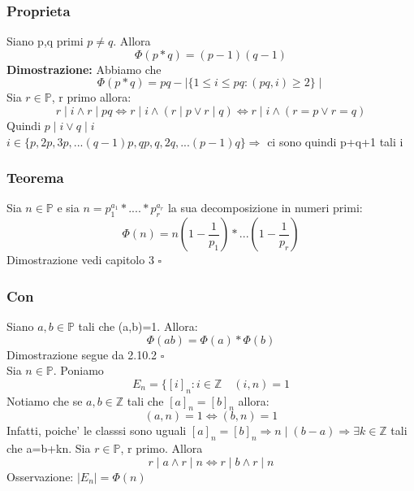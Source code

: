 \documentclass{article}
\begin{document}
     \subsubsection{Proprieta}
     \begin{flushleft}
      Siano p,q primi $p \neq q$. Allora 
       \begin{equation}
         \Phi (p*q)=(p-1)(q-1)
       \end{equation}
       \textbf{Dimostrazione:} Abbiamo che 
       \begin{equation}
         \Phi (p*q)=pq-\mid \{1 \leq i \leq pq : (pq,i) \geq 2\} \mid 
       \end{equation}
       Sia $r\in \mathbb{P}$, r primo allora:
       \begin{equation}
         r \mid i \land r \mid pq \iff r \mid i \land (r\mid p \lor r\mid q) \iff r\mid i \land (r=p \lor r=q)
       \end{equation}
       Quindi $p \mid i \lor q \mid i$ \\ 
       $i \in \{ p, 2p,3p,...(q-1)p,qp,q,2q,...(p-1)q\} \Rightarrow $ ci sono quindi p+q+1 tali i
     \end{flushleft}
     \subsubsection{Teorema}
     \begin{flushleft}
       Sia $n \in \mathbb{P}$ e sia $n = p^{a_1}_1*....*p^{a_r}_r$ la sua decomposizione in numeri primi:
       \begin{equation}
         \Phi (n) = n(1-\frac{1}{p_1})*...(1-\frac{1}{p_r})
       \end{equation}
        Dimostrazione vedi capitolo 3 $\square$ 
     \end{flushleft}
     \subsubsection{Con}
     \begin{flushleft}
       Siano $a,b \in \mathbb{P}$ tali che (a,b)=1. Allora:
       \begin{equation}
         \Phi (ab)=\Phi (a) * \Phi (b)
       \end{equation}
       Dimostrazione segue da 2.10.2 $\square$ \\ 
       Sia $n \in \mathbb{P}$. Poniamo
       \begin{equation}
         E_n = \{[i]_n: i\in \mathbb{Z} \quad (i,n)=1
       \end{equation}
      Notiamo che se $a,b \in \mathbb{Z}$ tali che $[a]_n=[b]_n$ allora:
       \begin{equation}
         (a,n)=1 \iff (b,n)=1
       \end{equation}
       Infatti, poiche' le classsi sono uguali $[a]_n=[b]_n \Rightarrow n \mid (b-a) \Rightarrow \exists k \in \mathbb{Z}$ tali che a=b+kn. Sia
       $r \in \mathbb{P}$, r primo. Allora
       \begin{equation}
        r\mid a \land r\mid n \iff r\mid b \land r\mid n
       \end{equation}
       Osservazione: $\mid E_n \mid = \Phi(n)$
     \end{flushleft}
\end{document}
